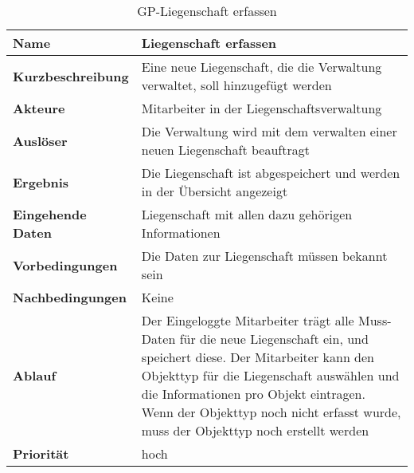 \begin{table}[H]
  \centering
  \settowidth{}
  \setlength\extrarowheight{2pt}
  \begin{tabulary}{1.0\textwidth}{|a|m{12cm}|}
    \hline
    \textbf{Name}&Liegenschaft erfassen\\
    \hline 
    \textbf{Kurzbeschreibung} & Eine neue Liegenschaft, die die Verwaltung verwaltet, soll hinzugefügt werden\\
    \hline
    \textbf{Akteure} & Mitarbeiter in der Liegenschaftsverwaltung\\
    \hline
    \textbf{Auslöser} & Die Verwaltung wird mit dem verwalten einer neuen Liegenschaft beauftragt\\
    \hline
    \textbf{Ergebnis} & Die Liegenschaft ist abgespeichert und werden in der Übersicht angezeigt\\
    \hline
    \textbf{Eingehende Daten} & Liegenschaft mit allen dazu gehörigen Informationen\\
    \hline
    \textbf{Vorbedingungen} & Die Daten zur Liegenschaft müssen bekannt sein\\
    \hline
    \textbf{Nachbedingungen} & Keine\\
    \hline
    \textbf{Ablauf} & Der Eingeloggte Mitarbeiter trägt alle Muss-Daten für die neue Liegenschaft ein, und speichert diese. Der Mitarbeiter kann den Objekttyp für die Liegenschaft auswählen und die Informationen pro Objekt eintragen. Wenn der Objekttyp noch nicht erfasst wurde, muss der Objekttyp noch erstellt werden\\
    \hline
    \textbf{Priorität} & hoch\\
    \hline
  \end{tabulary}
  \caption{GP-Liegenschaft erfassen}
\end{table}

